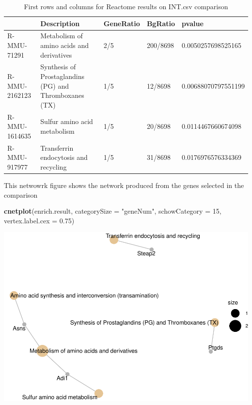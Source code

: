\documentclass[]{article}
\newenvironment{Shaded}{\begin{snugshade}}{\end{snugshade}}
\newcommand{\KeywordTok}[1]{\textcolor[rgb]{0.13,0.29,0.53}{\textbf{#1}}}
\newcommand{\DataTypeTok}[1]{\textcolor[rgb]{0.13,0.29,0.53}{#1}}
\newcommand{\DecValTok}[1]{\textcolor[rgb]{0.00,0.00,0.81}{#1}}
\newcommand{\FloatTok}[1]{\textcolor[rgb]{0.00,0.00,0.81}{#1}}
\newcommand{\StringTok}[1]{\textcolor[rgb]{0.31,0.60,0.02}{#1}}
\newcommand{\NormalTok}[1]{#1}
\begin{document}
\begin{table}

\caption{\label{tab:unnamed-chunk-61}First rows and columns for Reactome results on INT.csv comparison}
\centering
\begin{tabular}[t]{lllll}
\toprule
  & Description & GeneRatio & BgRatio & pvalue\\
\midrule
R-MMU-71291 & Metabolism of amino acids and derivatives & 2/5 & 200/8698 & 0.0050257698525165\\
R-MMU-2162123 & Synthesis of Prostaglandins (PG) and Thromboxanes (TX) & 1/5 & 12/8698 & 0.00688070797551199\\
R-MMU-1614635 & Sulfur amino acid metabolism & 1/5 & 20/8698 & 0.0114467660674098\\
R-MMU-917977 & Transferrin endocytosis and recycling & 1/5 & 31/8698 & 0.0176976576334369\\
\bottomrule
\end{tabular}
\end{table}

This netwowrk figure shows the network produced from the genes selected
in the comparison

\begin{Shaded}
\begin{Highlighting}[]
\KeywordTok{cnetplot}\NormalTok{(enrich.result, }\DataTypeTok{categorySize =} \StringTok{"geneNum"}\NormalTok{, }\DataTypeTok{schowCategory =} \DecValTok{15}\NormalTok{, }
\DataTypeTok{vertex.label.cex =} \FloatTok{0.75}\NormalTok{)}
\end{Highlighting}
\end{Shaded}

\includegraphics{delVal_AnaIsabel_ADO_PEC1_files/figure-latex/unnamed-chunk-62-1.pdf}
\end{document}
